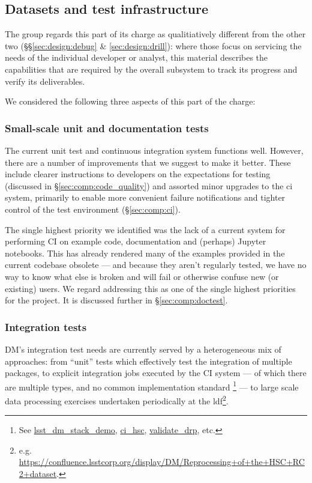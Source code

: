 \subsection{Datasets and test infrastructure}
\label{sec:design:test}

The group regards this part of its charge as qualitiatively different from the
other two (\S\S\ref{sec:design:debug} \& \ref{sec:design:drill}): where those
focus on servicing the needs of the individual developer or analyst, this
material describes the capabilities that are required by the overall subsystem
to track its progress and verify its deliverables.

We considered the following three aspects of this part of the charge:

\subsubsection{Small-scale unit and documentation tests}

The current unit test and continuous integration system functions well.
However, there are a number of improvements that we suggest to make it better.
These include clearer instructions to developers on the expectations for
testing (discussed in \S\ref{sec:comp:code_quality}) and assorted minor upgrades to the
\gls{ci} system, primarily to enable more convenient failure notifications and
tighter control of the test environment (\S\ref{sec:comp:ci}).

The single highest priority we identified was the lack of a current system for
performing CI on example code, documentation and (perhaps) Jupyter notebooks.
This has already rendered many of the examples provided in the current
codebase obsolete --- and because they aren't regularly tested, we have no way
to know what else is broken and will fail or otherwise confuse new (or
existing) users. We regard addressing this as one of the single highest
priorities for the project. It is discussed further in
\S\ref{sec:comp:doctest}.

\subsubsection{Integration tests}
\label{sec:design:test:integration}

DM's integration test needs are currently served by a heterogeneous mix of
approaches: from ``unit'' tests which effectively test the integration of
multiple packages, to explicit integration jobs executed by the CI
system --- of which there are multiple types, and no common
implementation standard \footnote{See
\href{https://github.com/lsst/lsst_dm_stack_demo}{lsst\_dm\_stack\_demo},
\href{https://github.com/lsst/ci_hsc}{ci\_hsc},
\href{https://github.com/lsst/validate_drp}{validate\_drp}, etc.} --- to large
scale data processing exercises undertaken periodically at the
\gls{ldf}\footnote{e.g.
\url{https://confluence.lsstcorp.org/display/DM/Reprocessing+of+the+HSC+RC2+dataset}.}.

